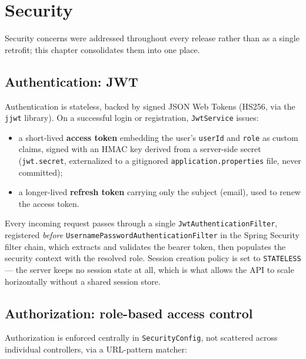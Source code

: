 \documentclass[a4paper,12pt]{report}
\begin{document}
\chapter{Security}
\label{chap:security}

Security concerns were addressed throughout every release rather than as
a single retrofit; this chapter consolidates them into one place.

\section{Authentication: JWT}
Authentication is stateless, backed by signed JSON Web Tokens
(HS256, via the \texttt{jjwt} library). On a successful login or
registration, \texttt{JwtService} issues:
\begin{itemize}[leftmargin=*]
  \item a short-lived \textbf{access token} embedding the user's
        \texttt{userId} and \texttt{role} as custom claims, signed with
        an HMAC key derived from a server-side secret (\texttt{jwt.secret},
        externalized to a gitignored \texttt{application.properties} file,
        never committed);
  \item a longer-lived \textbf{refresh token} carrying only the subject
        (email), used to renew the access token.
\end{itemize}
Every incoming request passes through a single
\texttt{JwtAuthenticationFilter}, registered \emph{before}
\texttt{UsernamePasswordAuthenticationFilter} in the Spring Security
filter chain, which extracts and validates the bearer token, then
populates the security context with the resolved role. Session creation
policy is set to \texttt{STATELESS} --- the server keeps no session state
at all, which is what allows the API to scale horizontally without a
shared session store.

\section{Authorization: role-based access control}
Authorization is enforced centrally in \texttt{SecurityConfig}, not
scattered across individual controllers, via a URL-pattern matcher:
\end{document}
